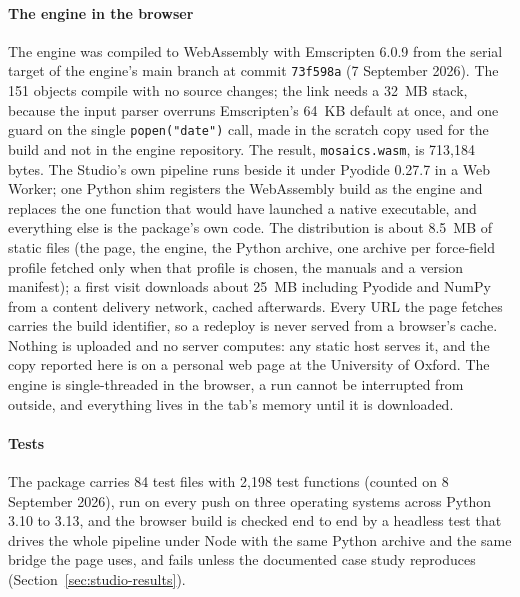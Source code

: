 \paragraph{The engine in the browser}
The engine was compiled to WebAssembly with Emscripten
6.0.9\cite{zakai2011emscripten} from the serial target of the engine's main
branch at commit \texttt{73f598a} (7 September 2026). The 151 objects compile
with no source changes; the link needs a 32~MB stack, because the input parser
overruns Emscripten's 64~KB default at once, and one guard on the single
\texttt{popen("date")} call, made in the scratch copy used for the build and
not in the engine repository. The result, \texttt{mosaics.wasm}, is 713,184
bytes. The Studio's own pipeline runs beside it under Pyodide
0.27.7\cite{pyodide-software} in a Web Worker; one Python shim registers the
WebAssembly build as the engine and replaces the one function that would have
launched a native executable, and everything else is the package's own code. The
distribution is about 8.5~MB of static files (the page, the engine, the Python
archive, one archive per force-field profile fetched only when that profile is
chosen, the manuals and a version manifest); a first visit downloads about
25~MB including Pyodide and NumPy from a content delivery network, cached
afterwards. Every URL the page fetches carries the build identifier, so a
redeploy is never served from a browser's cache. Nothing is uploaded and no
server computes: any static host serves it, and the copy reported here is on a
personal web page at the University of Oxford. The engine is single-threaded
in the browser, a run cannot be interrupted from outside, and everything lives
in the tab's memory until it is downloaded.

\paragraph{Tests}
The package carries 84 test files with 2,198 test functions (counted on 8
September 2026), run on every push on three operating systems across Python
3.10 to 3.13, and the browser build is checked end to end by a headless test
that drives the whole pipeline under Node with the same Python archive and the
same bridge the page uses, and fails unless the documented case study
reproduces (Section~\ref{sec:studio-results}).
